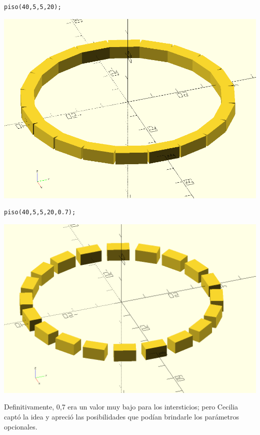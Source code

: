   \begin{minipage}[]{.45\textwidth}
    \begin{lstlisting}[numbers=none]
  piso(40,5,5,20);
    \end{lstlisting}
  \end{minipage}\hfill
  \begin{minipage}[]{.55\textwidth}
      \centering
      \includegraphics[width=.9\textwidth]{imagenes/piso-solucion-2}
    \end{minipage}



  \begin{minipage}[]{.45\textwidth}
    \begin{lstlisting}[numbers=none]
  piso(40,5,5,20,0.7);
    \end{lstlisting}
  \end{minipage}\hfill
  \begin{minipage}[]{.55\textwidth}
      \centering
      \includegraphics[width=.9\textwidth]{imagenes/piso-solucion-0-7}
    \end{minipage}

    \vspace{1em}

  Definitivamente, 0,7 era un valor muy bajo para los intersticios;
  pero Cecilia captó la idea y apreció las posibilidades que podían
  brindarle los parámetros opcionales.
  

